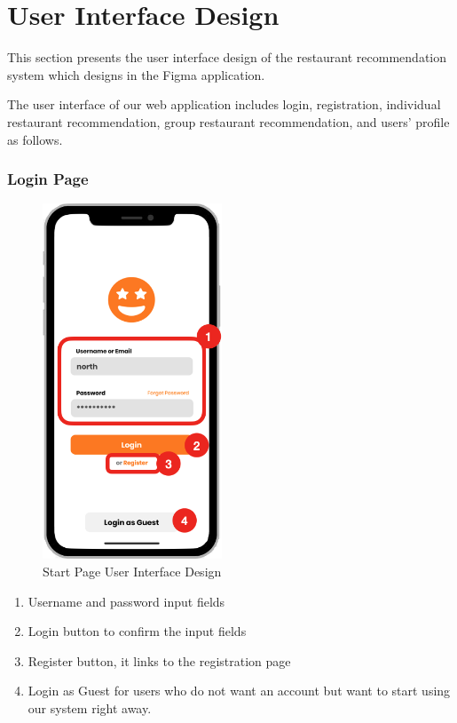\documentclass[12pt,oneside,openright,a4paper]{cpe-english-project}
\begin{document}
\section{User Interface Design}
This section presents the user interface design of the restaurant recommendation system which designs in the Figma application.

The user interface of our web application includes login, registration, individual restaurant recommendation, group restaurant recommendation, and users’ profile as follows.

\newpage
\subsubsection{Login Page}
\begin{figure}[H]\centering
\includegraphics[height=300pt]{./images/3ui_StartPageUserInterfaceDesign.png}
\caption{Start Page User Interface Design}\label{fig:3ui_StartPageUserInterfaceDesign}
\end{figure}\vspace{-24pt}

\begin{enumerate}
\item Username and password input fields
\item Login button to confirm the input fields
\item Register button, it links to the registration page
\item Login as Guest for users who do not want an account but want to start using our system right away.
\end{enumerate}
\end{document}

